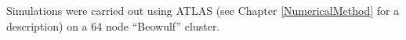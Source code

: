 %
%
%
%
%
%
Simulations were carried out using ATLAS (see Chapter \ref{NumericalMethod} for a description) on a 64 node ``Beowulf'' cluster.


